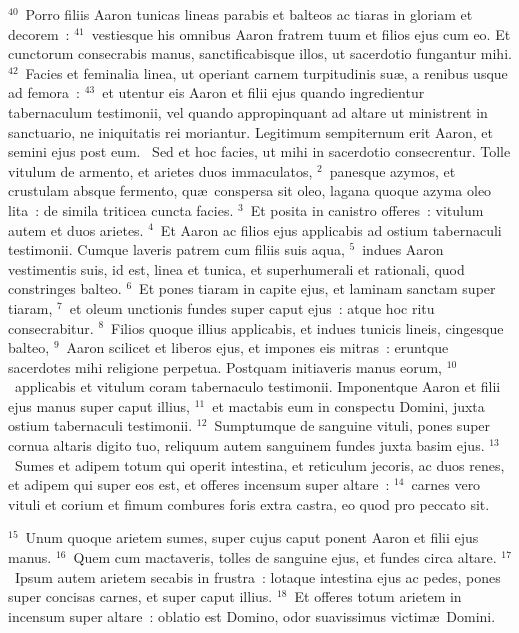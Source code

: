 ${}^{40}$~Porro filiis Aaron tunicas lineas parabis et balteos ac tiaras in gloriam et decorem~:
${}^{41}$~vestiesque his omnibus Aaron fratrem tuum et filios ejus cum eo. Et cunctorum consecrabis manus, sanctificabisque illos, ut sacerdotio fungantur mihi.
${}^{42}$~Facies et feminalia linea, ut operiant carnem turpitudinis su\ae , a renibus usque ad femora~:
${}^{43}$~et utentur eis Aaron et filii ejus quando ingredientur tabernaculum testimonii, vel quando appropinquant ad altare ut ministrent in sanctuario, ne iniquitatis rei moriantur. Legitimum sempiternum erit Aaron, et semini ejus post eum.
~\lettrine[lines=10,image=true,loversize=0.05,lraise=-0.03]{S}{}ed et hoc facies, ut mihi in sacerdotio consecrentur. Tolle vitulum de armento, et arietes duos immaculatos,
${}^{2}$~panesque azymos, et crustulam absque fermento, qu\ae\ conspersa sit oleo, lagana quoque azyma oleo lita~: de simila triticea cuncta facies.
${}^{3}$~Et posita in canistro offeres~: vitulum autem et duos arietes.
${}^{4}$~Et Aaron ac filios ejus applicabis ad ostium tabernaculi testimonii. Cumque laveris patrem cum filiis suis aqua,
${}^{5}$~indues Aaron vestimentis suis, id est, linea et tunica, et superhumerali et rationali, quod constringes balteo.
${}^{6}$~Et pones tiaram in capite ejus, et laminam sanctam super tiaram,
${}^{7}$~et oleum unctionis fundes super caput ejus~: atque hoc ritu consecrabitur.
${}^{8}$~Filios quoque illius applicabis, et indues tunicis lineis, cingesque balteo,
${}^{9}$~Aaron scilicet et liberos ejus, et impones eis mitras~: eruntque sacerdotes mihi religione perpetua. Postquam initiaveris manus eorum,
${}^{10}$~applicabis et vitulum coram tabernaculo testimonii. Imponentque Aaron et filii ejus manus super caput illius,
${}^{11}$~et mactabis eum in conspectu Domini, juxta ostium tabernaculi testimonii.
${}^{12}$~Sumptumque de sanguine vituli, pones super cornua altaris digito tuo, reliquum autem sanguinem fundes juxta basim ejus.
${}^{13}$~Sumes et adipem totum qui operit intestina, et reticulum jecoris, ac duos renes, et adipem qui super eos est, et offeres incensum super altare~:
${}^{14}$~carnes vero vituli et corium et fimum combures foris extra castra, eo quod pro peccato sit.


${}^{15}$~Unum quoque arietem sumes, super cujus caput ponent Aaron et filii ejus manus.
${}^{16}$~Quem cum mactaveris, tolles de sanguine ejus, et fundes circa altare.
${}^{17}$~Ipsum autem arietem secabis in frustra~: lotaque intestina ejus ac pedes, pones super concisas carnes, et super caput illius.
${}^{18}$~Et offeres totum arietem in incensum super altare~: oblatio est Domino, odor suavissimus victim\ae\ Domini.


